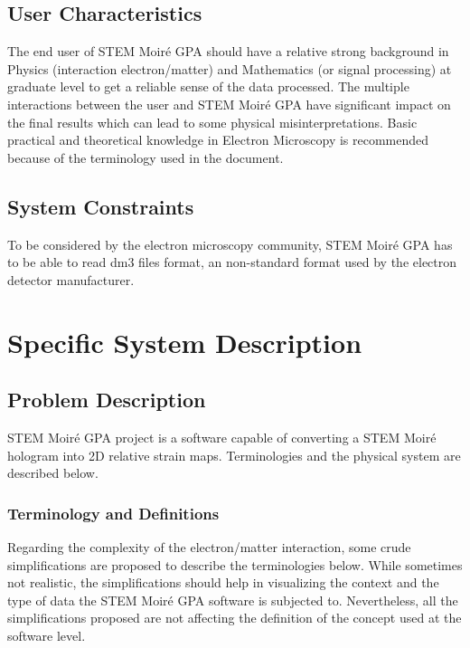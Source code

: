 \documentclass[12pt]{article}
\newcommand{\progname}{STEM Moir{\'e} GPA}
\begin{document}

\subsection{User Characteristics} \label{SecUserCharacteristics}

The end user of \progname{} should have a relative strong background in Physics (interaction electron/matter) and Mathematics (or signal processing) at graduate level to get a reliable sense of the data processed. The multiple interactions between the user and \progname{} have  significant impact on the final results which can lead to some physical misinterpretations. Basic practical and theoretical knowledge in Electron Microscopy is recommended because of the terminology used in the document. 

\subsection{System Constraints}

To be considered by the electron microscopy community, \progname{} has to be able to read dm3 files format, an non-standard format used by the electron detector manufacturer. 

\section{Specific System Description}
\subsection{Problem Description} \label{Sec_pd}

STEM Moir{\'e} GPA project is a software capable of converting a STEM Moir{\'e} hologram into 2D relative strain maps. Terminologies and the physical system are described below.

\subsubsection{Terminology and Definitions}

Regarding the complexity of the electron/matter interaction, some crude  simplifications are proposed to describe the terminologies below. While sometimes not realistic, the simplifications should help in visualizing the context and the type of data the STEM Moir{\'e} GPA software is subjected to. Nevertheless, all the simplifications proposed are not affecting the definition of the concept used at the software level.
\end{document}

